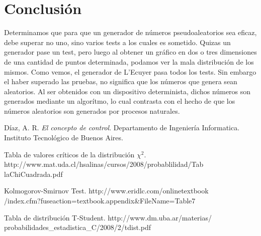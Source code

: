 \documentclass[10pt,journal,compsoc]{IEEEtran}
\begin{document}
\section{Conclusi\'on}
Determinamos que para que un generador de n\'umeros pseudoaleatorios sea eficaz, debe superar no uno, 
sino varios tests a los cuales es sometido. Quizas un generador pase un test, pero luego al obtener un gr\'afico
en dos o tres dimensiones de una cantidad de puntos determinada, podamos ver la mala distribuci\'on de los mismos. 
Como vemos, el generador de L'Ecuyer pasa todos los tests. Sin embargo el haber superado las pruebas, no significa que
los n\'umeros que genera sean aleatorios. Al ser obtenidos con un dispositivo determinista, dichos n\'umeros son generados
mediante un algor\'itmo, lo cual contrasta con el hecho de que los n\'umeros aleatorios son generados por procesos naturales.



\begin{thebibliography}{1}

D\'iaz, A. R. \emph{El concepto de control}. Departamento de Ingenier\'ia Informatica. 
Instituto Tecnol\'ogico de Buenos Aires.

Tabla de valores cr\'iticos de la distribuci\'on $\chi^2$. http://www.mat.uda.cl/hsalinas/cursos/2008/probablilidad/Tab\\laChiCuadrada.pdf

Kolmogorov-Smirnov Test. http://www.eridlc.com/onlinetextbook\\/index.cfm?fuseaction=textbook.appendix\&FileName=Table7

Tabla de distribuci\'on T-Student. http://www.dm.uba.ar/materias/\\probabilidades\_estadistica\_C/2008/2/tdist.pdf

\end{thebibliography}
\end{document}
